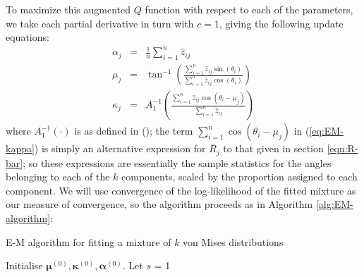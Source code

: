 \documentclass[../../ArchStats.tex]{subfiles}
\begin{document}
To maximize this augmented $Q$ function with respect to each of the parameters, we take each partial derivative in turn with $c=1$, giving the following update equations:
\begin{eqnarray}
\label{eq:EM-alpha}
\alpha_j &=& \frac{1}{n} \sum_{i=1}^n \hat{z}_{ij} \\[5pt]
\label{eq:EM-mu}
\mu_j &=& \tan^{-1} \left( \frac{\sum_{i=1}^n \hat{z}_{ij} \sin(\theta_i)}{\sum_{i=1}^n \hat{z}_{ij} \cos(\theta_i)} \right) \\[5pt]
\label{eq:EM-kappa}
\kappa_j &=& A_1^{-1} \left(\frac{\sum_{i=1}^n \hat{z}_{ij} \cos(\theta_i - \mu_j)}{\sum_{i=1}^n \hat{z}_{ij}}\right)
\end{eqnarray}
where $A_1^{-1}(\cdot)$ is as defined in (); the term $\sum_{i=1}^n \cos(\theta_i - \mu_j)$ in (\ref{eq:EM-kappa}) is simply an alternative expression for $\bar{R}_j$ to that given in section \ref{eqn:R-bar}; so these expressions are essentially the sample statistics for the angles belonging to each of the $k$ components, scaled by the proportion assigned to each component. We will use convergence of the log-likelihood of the fitted mixture as our measure of convergence, so the algorithm proceeds as in Algorithm \ref{alg:EM-algorithm}:

\begin{algorithm}[h!]
    \caption{E-M algorithm for fitting a mixture of $k$ von Mises distributions}
	\label{alg:EM-algorithm}



Initialise $\boldsymbol{\mu}^{(0)}, \boldsymbol{\kappa}^{(0)}, \boldsymbol{\alpha}^{(0)}$. Let $s$ = 1\;

\end{algorithm}
\end{document}
